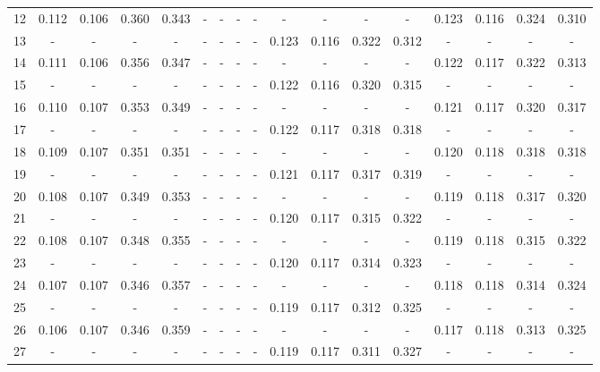 \documentclass{report}
\begin{document}
\begin{appendices}
\begin{sidewaystable}
\begin{tabular}{|c|cccc|cccc|cccc|cccc|}
12 & 0.112 & 0.106 & 0.360 & 0.343 &   -   &   -   &   -   &   -   &   -   &   -   &   -   &   -   & 0.123 & 0.116 & 0.324 & 0.310\\
13 &   -   &   -   &   -   &   -   &   -   &   -   &   -   &   -   & 0.123 & 0.116 & 0.322 & 0.312 &   -   &   -   &   -   &   -  \\
14 & 0.111 & 0.106 & 0.356 & 0.347 &   -   &   -   &   -   &   -   &   -   &   -   &   -   &   -   & 0.122 & 0.117 & 0.322 & 0.313\\
15 &   -   &   -   &   -   &   -   &   -   &   -   &   -   &   -   & 0.122 & 0.116 & 0.320 & 0.315 &   -   &   -   &   -   &   -  \\
16 & 0.110 & 0.107 & 0.353 & 0.349 &   -   &   -   &   -   &   -   &   -   &   -   &   -   &   -   & 0.121 & 0.117 & 0.320 & 0.317\\
17 &   -   &   -   &   -   &   -   &   -   &   -   &   -   &   -   & 0.122 & 0.117 & 0.318 & 0.318 &   -   &   -   &   -   &   -  \\
18 & 0.109 & 0.107 & 0.351 & 0.351 &   -   &   -   &   -   &   -   &   -   &   -   &   -   &   -   & 0.120 & 0.118 & 0.318 & 0.318\\
19 &   -   &   -   &   -   &   -   &   -   &   -   &   -   &   -   & 0.121 & 0.117 & 0.317 & 0.319 &   -   &   -   &   -   &   -  \\
20 & 0.108 & 0.107 & 0.349 & 0.353 &   -   &   -   &   -   &   -   &   -   &   -   &   -   &   -   & 0.119 & 0.118 & 0.317 & 0.320\\
21 &   -   &   -   &   -   &   -   &   -   &   -   &   -   &   -   & 0.120 & 0.117 & 0.315 & 0.322 &   -   &   -   &   -   &   -  \\
22 & 0.108 & 0.107 & 0.348 & 0.355 &   -   &   -   &   -   &   -   &   -   &   -   &   -   &   -   & 0.119 & 0.118 & 0.315 & 0.322\\
23 &   -   &   -   &   -   &   -   &   -   &   -   &   -   &   -   & 0.120 & 0.117 & 0.314 & 0.323 &   -   &   -   &   -   &   -  \\
24 & 0.107 & 0.107 & 0.346 & 0.357 &   -   &   -   &   -   &   -   &   -   &   -   &   -   &   -   & 0.118 & 0.118 & 0.314 & 0.324\\
25 &   -   &   -   &   -   &   -   &   -   &   -   &   -   &   -   & 0.119 & 0.117 & 0.312 & 0.325 &   -   &   -   &   -   &   -  \\
26 & 0.106 & 0.107 & 0.346 & 0.359 &   -   &   -   &   -   &   -   &   -   &   -   &   -   &   -   & 0.117 & 0.118 & 0.313 & 0.325\\
27 &   -   &   -   &   -   &   -   &   -   &   -   &   -   &   -   & 0.119 & 0.117 & 0.311 & 0.327 &   -   &   -   &   -   &   -  \\

\end{tabular}
\end{sidewaystable}
\end{appendices}
\end{document}
